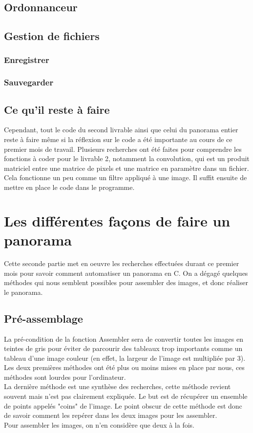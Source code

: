 \documentclass[a4paper,french,12pt]{report}
\begin{document}
	\section{Ordonnanceur}
	
	\section{Gestion de fichiers}
	\subsection{Enregistrer}
	\subsection{Sauvegarder}
	
	
	\section{Ce qu'il reste à faire}
		    Cependant, tout le code du second livrable ainsi que celui du panorama entier reste à faire même si la réflexion sur le code a été importante au cours de ce premier mois de travail. Plusieurs recherches ont été faites pour comprendre les fonctions à coder pour le livrable 2, notamment la convolution, qui est un produit matriciel entre une matrice de pixels et une matrice en paramètre dans un fichier. Cela fonctionne un peu comme un filtre appliqué à une image. Il suffit ensuite de mettre en place le code dans le programme.\\
	\chapter{Les différentes façons de faire un panorama}
	      Cette seconde partie met en oeuvre les recherches effectuées durant ce premier mois pour savoir comment automatiser un panorama en C. On a dégagé quelques méthodes qui nous semblent possibles pour assembler des images, et donc réaliser le panorama.
		\section{Pré-assemblage}
		    La pré-condition de la fonction Assembler sera de convertir toutes les images en teintes de gris pour éviter de parcourir des tableaux trop importants comme un tableau d'une image couleur (en effet, la largeur de l'image est multipliée par 3). \\
		    Les deux premières méthodes ont été plus ou moins mises en place par nous, ces méthodes sont lourdes pour l'ordinateur. \\
		    La dernière méthode est une synthèse des recherches, cette méthode revient souvent mais n'est pas clairement expliquée. Le but est de récupérer un ensemble de points appelés "coins" de l'image. Le point obscur de cette méthode est donc de savoir comment les repérer dans les deux images pour les assembler.\\
		    Pour assembler les images, on n'en considère que deux à la fois.
\end{document}
